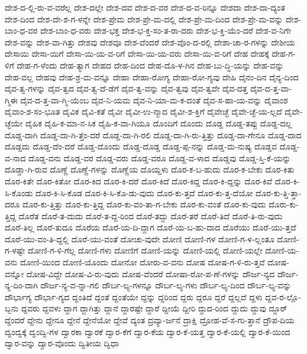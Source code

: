 {ದೇಶ-ದ-ಲ್ಲಿ-ರು-ವ-ವರೆಲ್ಲ
ದೇಶ-ದಲ್ಲೇ
ದೇಶ-ದವ
ದೇಶ-ದ-ವರ
ದೇಶ-ದ-ವ-ರಿನ್ನೂ
ದೇಶದಾ
ದೇಶ-ದಾ-ದ್ಯಂತ
ದೇಶ-ದಿಂದ
ದೇಶ-ದೇ-ಶ-ಗ-ಳನ್ನೇ
ದೇಶ-ಪ್ರೇಮ
ದೇಶ-ಪ್ರೇ-ಮ-ದಲ್ಲಿ
ದೇಶ-ಪ್ರೇ-ಮ-ದಿಂದ
ದೇಶ-ಪ್ರೇ-ಮ-ವನ್ನು
ದೇಶ-ಬಾಂ-ಧ-ವರ
ದೇಶ-ಬಾಂ-ಧ-ವರು
ದೇಶ-ಭಕ್ತ
ದೇಶ-ಭ-ಕ್ತ-ಸಂ-ತ-ರಾ-ದರು
ದೇಶ-ಭ-ಕ್ತಿ-ಯೆಂ-ದರೆ
ದೇಶ-ವ-ನಿಗೇ
ದೇಶ-ವನ್ನು
ದೇಶ-ವಾ-ಗಿತ್ತು
ದೇಶವು
ದೇಶವೂ
ದೇಶ-ವೆಂದರೆ
ದೇಶ-ವೊಂ-ದ-ರಲ್ಲಿ
ದೇಶಾ-ಚಾ-ರ-ಗಳನ್ನು
ದೇಶೀಯ
ದೇಸಾಯಿ
ದೇಸಾ-ಯಿಗೆ
ದೇಸಾ-ಯಿ-ಯ-ವ-ರಿಗೆ
ದೇಸಾ-ಯಿ-ಯ-ವರು
ದೇಸಾ-ಯಿ-ವ-ರಿಗೆ
ದೇಹ
ದೇಹಕ್ಕೆ
ದೇಹ-ಗ-ಳಿಗೆ
ದೇಹ-ಗ-ಳೆಂದು
ದೇಹ-ತ್ಯಾಗ
ದೇಹದ
ದೇಹ-ದಿಂದ
ದೇಹ-ದೊ-ಳ-ಗಿನ
ದೇಹ-ಬು-ದ್ಧಿ-ಯನ್ನು
ದೇಹ-ವನ್ನು
ದೇಹ-ವಲ್ಲ
ದೇಹವು
ದೇಹ-ಶ್ರ-ಮ-ವನ್ನೂ
ದೇಹಾ
ದೇಹಾ-ರೋಗ್ಯ
ದೇಹಾ-ರೋ-ಗ್ಯವು
ದೇಹಿ
ದೈನಂ-ದಿನ
ದೈನ್ಯ-ದಿಂದ
ದೈವ-ತ್ವ-ಗಳನ್ನು
ದೈವ-ತ್ವದ
ದೈವ-ತ್ವ-ದೆ-ಡೆಗೆ
ದೈವ-ತ್ವ-ವನ್ನು
ದೈವ-ತ್ವವು
ದೈವ-ತ್ವವೇ
ದೈವ-ದತ್ತ
ದೈವ-ದ-ತ್ತ-ವಾ-ಗ್ಮಿಈ
ದೈವ-ದ-ತ್ತ-ವಾ-ಗ್ಮಿ-ಯೆಂಬ
ದೈವ-ನಿ-ಯಮ
ದೈವ-ನಿ-ಯಾ-ಮ-ಕ-ದಂತೆ
ದೈವ-ಸ-ಹಾ-ಯ-ವನ್ನು
ದೈವಾಂಶ
ದೈವಾಂ-ಶ-ಸಂ-ಭೂತ
ದೈವಿಕ
ದೈವಿ-ಕತೆ
ದೈವೀ
ದೈವೀ-ಉ-ನ್ಮಾದ
ದೈವೀ-ಶ-ಕ್ತಿಗೆ
ದೈವೇಚ್ಛೆ
ದೈವೇ-ಚ್ಛೆ-ಯ-ಲ್ಲದೆ
ದೈವೇ-ಚ್ಛೆಯೇ
ದೈಹಿಕ
ದೈಹಿ-ಕ-ಮಾ-ನ-ಸಿಕ
ದೈಹಿ-ಕ-ವಾ-ಗಿಯೂ
ದೊಂದಿಗೆ
ದೊಂದು
ದೊಡ್ಡ
ದೊಡ್ಡ-ತಪ್ಪು
ದೊಡ್ಡ-ದಲ್ಲ
ದೊಡ್ಡ-ದಾಗಿ
ದೊಡ್ಡ-ದಾ-ಗಿ-ತ್ತೆಂ-ದರೆ
ದೊಡ್ಡ-ದಾ-ಗಿ-ರಲಿ
ದೊಡ್ಡ-ದಾ-ಗಿ-ರು-ತ್ತಿತ್ತು
ದೊಡ್ಡ-ದಾ-ಗೇನೂ
ದೊಡ್ಡ-ದಾದ
ದೊಡ್ಡದು
ದೊಡ್ಡ-ದೆಂ-ದರೆ
ದೊಡ್ಡ-ದೊಂದು
ದೊಡ್ಡ-ದೊಡ್ಡ
ದೊಡ್ಡ-ಪ್ಪ-ನನ್ನು
ದೊಡ್ಡ-ಮ-ನುಷ್ಯ
ದೊಡ್ಡವ
ದೊಡ್ಡ-ವ-ನಾದ
ದೊಡ್ಡ-ವನು
ದೊಡ್ಡ-ವರ
ದೊಡ್ಡ-ವರು
ದೊಡ್ಡ-ವರೂ
ದೊಡ್ಡ-ವ-ಳಾದ
ದೊಡ್ಡವು
ದೊಡ್ಡ-ಸ್ತಿ-ಕೆ-ಯನ್ನು
ದೊಡ್ಡಾ-ಗಿ-ರುವ
ದೊಣ್ಣೆ
ದೊಣ್ಣೆ-ಗಳನ್ನು
ದೊಣ್ಣೆಯ
ದೊಯ್ದಳು
ದೊರ-ಕ-ಬ-ಹುದು
ದೊರ-ಕ-ಬೇಕು
ದೊರ-ಕಿತು
ದೊರ-ಕಿತೇ
ದೊರ-ಕಿತೋ
ದೊರ-ಕಿದ
ದೊರ-ಕಿ-ದರೆ
ದೊರ-ಕಿದೆ
ದೊರ-ಕಿದ್ದ
ದೊರ-ಕಿ-ದ್ದನ್ನು
ದೊರ-ಕಿವೆ
ದೊರ-ಕಿ-ಸಿ-ಕೊಂಡು
ದೊರ-ಕಿ-ಸಿ-ಕೊಡ
ದೊರ-ಕಿ-ಸಿ-ಕೊ-ಡು-ವುದು
ದೊರ-ಕು-ತ್ತದೆ
ದೊರ-ಕು-ತ್ತ-ದೆಯೋ
ದೊರ-ಕು-ತ್ತಿ-ತ್ತಾ-ದರೂ
ದೊರ-ಕು-ತ್ತಿತ್ತು
ದೊರ-ಕು-ತ್ತಿದ್ದ
ದೊರ-ಕು-ವಂ-ತಾ-ಗ-ಬೇಕು
ದೊರ-ಕು-ವಂತೆ
ದೊರ-ಕು-ವುದು
ದೊರು-ಕು-ತ್ತಿದ್ದ
ದೊರೆತ
ದೊರೆ-ತ-ದುದು
ದೊರೆ-ತ-ದ್ದ-ರಿಂದ
ದೊರೆ-ತದ್ದು
ದೊರೆ-ತರೆ
ದೊರೆ-ತಿದೆ
ದೊರೆ-ತಿ-ರು-ವುದು
ದೊರೆ-ತಿಲ್ಲ
ದೊರೆ-ತುದೂ
ದೊರೆಯ
ದೊರೆ-ಯ-ದಿ-ದ್ದಾಗ
ದೊರೆ-ಯ-ಬ-ಹು-ದಾದ
ದೊರೆಯು
ದೊರೆ-ಯು-ತ್ತದೆ
ದೊರೆ-ಯು-ವಂ-ತಿ-ದ್ದಲ್ಲಿ
ದೊರೆ-ಯು-ವಂತೆ
ದೋಚು-ವುದೇ
ದೋಣಿ
ದೋಣಿ-ಗಳ
ದೋಣಿ-ಗ-ಳ-ಲ್ಲಂತೂ
ದೋಣಿ-ಗ-ಳಷ್ಟೇ
ದೋಣಿ-ಗ-ಳಿ-ಗೆಲ್ಲ
ದೋಣಿ-ಗಳು
ದೋಣಿಗೆ
ದೋಣಿ-ಯನ್ನು
ದೋಣಿ-ಯಲ್ಲಿ
ದೋಣಿ-ಯಲ್ಲೇ
ದೋಣಿ-ಯ-ವನು
ದೋಣಿ-ಯಿಂದ
ದೋಣಿ-ಯೊಂದು
ದೋನೋ
ದೋರು-ವ-ವನು
ದೋಷ
ದೋಷ-ಗ-ಳಿ-ರು-ತ್ತವೆ
ದೋಷ-ವನ್ನೋ
ದೋಷ-ವಿದ್ದೇ
ದೋಷ-ವಿ-ರು-ವುದು
ದೋಷ-ವೆಂದರೆ
ದೋಷಾ-ರೋ-ಪ-ಣೆ-ಗಳನ್ನು
ದೌರ್ಜ-ನ್ಯದ
ದೌರ್ಜ-ನ್ಯ-ದಿಂ-ದಾಗಿ
ದೌರ್ಜ-ನ್ಯ-ವ-ನ್ನಾ-ಗಲಿ
ದೌರ್ಬ-ಲ್ಯ-ಗಳನ್ನೂ
ದೌರ್ಬ-ಲ್ಯ-ಗಳು
ದೌರ್ಬ-ಲ್ಯ-ದಿಂದ
ದೌರ್ಬ-ಲ್ಯ-ವನ್ನು
ದೌರ್ಭಾಗ್ಯ
ದೌರ್ಭಾ-ಗ್ಯದ
ದ್ದಂತಿದೆ
ದ್ದಂತೆ
ದ್ದಂತೆಯೇ
ದ್ದನ್ನು
ದ್ದರಿಂದ
ದ್ದರು
ದ್ದರೂ
ದ್ದರೆ
ದ್ದಲ್ಲದೆ
ದ್ದಳು
ದ್ದವ-ರ-ಲ್ಲೊ-ಬ್ಬನು
ದ್ದವರು
ದ್ದವಳು
ದ್ದಾಗ
ದ್ದಾಗಿತ್ತು
ದ್ದಾನೆ
ದ್ದಾರಷ್ಟೇ
ದ್ದಾರೆ
ದ್ದೀಯೆ
ದ್ದೀರಿ
ದ್ದುದ-ರಿಂದ
ದ್ದುದು
ದ್ದುವು
ದ್ದೂರ್
ದ್ದೆಂದರೆ
ದ್ದೇನು
ದ್ದೇನೂ
ದ್ದೇನೆ
ದ್ದೇನೆಯೋ
ದ್ದೇವೆ
ದ್ಯಂತ
ದ್ರವ್ಯಾ-ರ್ಜನೆ
ದ್ರಾಕ್ಷಿ
ದ್ರೋಹ-ವೆ-ಸ-ಗು-ತ್ತಾನೆ
ದ್ರೌಪ-ದಿಯ
ದ್ವಂದ್ವಕ್ಕೆ
ದ್ವಂದ್ವಿ-ಗಳ
ದ್ವಾರಕಾ
ದ್ವಾರಕೆ
ದ್ವಾರ-ಕೆಗೆ
ದ್ವಾರ-ಕೆಯ
ದ್ವಾರ-ಕೆ-ಯತ್ತ
ದ್ವಾರ-ಕೆ-ಯಲ್ಲಿ
ದ್ವಾರ-ಕೆ-ಯಿಂದ
ದ್ವಾರ-ವನ್ನು
ದ್ವಾರ-ವೊಂದು
ದ್ವಿತೀಯ
ದ್ವಿಧಾ
}
